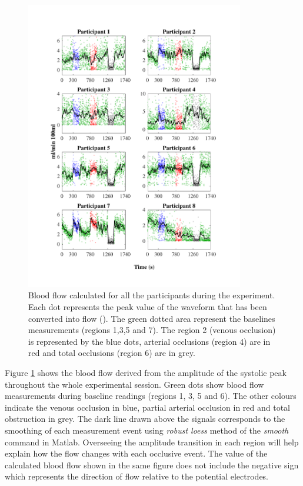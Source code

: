 \begin{figure}[!htbp]
	\centering
	\includegraphics[width=0.85\textwidth,trim={1.5cm 0.5cm 1.5cm 1.5cm},clip]{figure_apa_8}
	\caption[Blood flow calculated from impedance plethysmography waveform at the time of the whole expetiment]{Blood flow calculated for all the participants during the experiment. Each dot represents the peak value of the waveform that has been converted into flow (\si{\bfv}). The green dotted area represent the baselines measurements (regions 1,3,5 and 7). The region 2 (venous occlusion) is represented by the blue dots, arterial occlusions (region 4) are in red and total occlusions (region 6) are in grey.}
	\label{fig:blood_flow_plethysmography}
\end{figure}

Figure \ref{fig:blood_flow_plethysmography} shows the blood flow derived from the amplitude of the systolic peak throughout the whole experimental session. Green dots show blood flow measurements during baseline readings (regions 1, 3, 5 and 6). The other colours indicate the venous occlusion in blue, partial arterial occlusion in red and total obstruction in grey. The dark line drawn above the signals corresponds to the smoothing of each measurement event using \textit{robust loess} method of the \textit{smooth} command in Matlab. Overseeing the amplitude transition in each region will help explain how the flow changes with each occlusive event. The value of the calculated blood flow shown in the same figure does not include the negative sign which represents the direction of flow relative to the potential electrodes.

